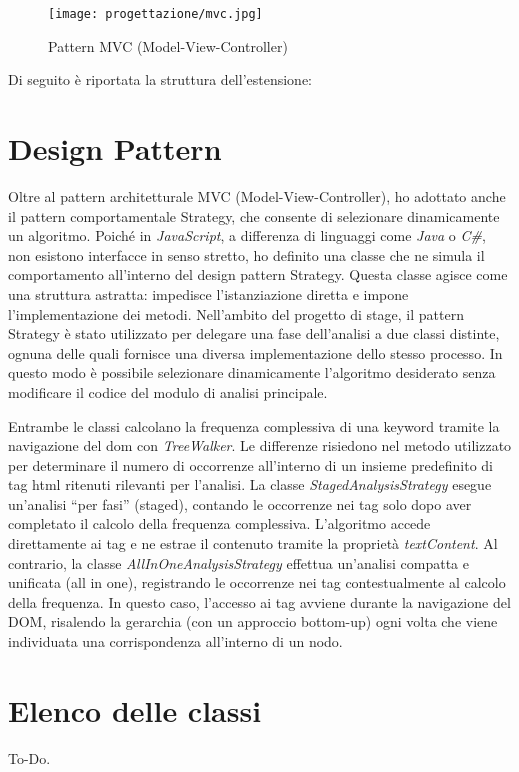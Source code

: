 \begin{figure}[H] 
    \centering 
    \texttt{[image: progettazione/mvc.jpg]} 
    \caption{Pattern MVC (Model-View-Controller)}
\end{figure}

\par\noindent Di seguito è riportata la struttura dell'estensione:

\vspace{10pt}
\begin{samepage}
\end{samepage}

\section{Design Pattern}
\label{sec:design-pattern}

\par Oltre al pattern architetturale MVC (Model-View-Controller), ho adottato anche il pattern comportamentale Strategy, che consente di selezionare dinamicamente un algoritmo. Poiché in \textit{JavaScript}, a differenza di linguaggi come \textit{Java} o \textit{C\#}, non esistono interfacce in senso stretto, ho definito una classe che ne simula il comportamento all’interno del design  pattern Strategy. Questa classe agisce come una struttura astratta: impedisce l'istanziazione diretta e impone l’implementazione dei metodi. Nell’ambito del progetto di stage, il pattern Strategy è stato utilizzato per delegare una fase dell’analisi a due classi distinte, ognuna delle quali fornisce una diversa implementazione dello stesso processo. In questo modo è possibile selezionare dinamicamente l’algoritmo desiderato senza modificare il codice del modulo di analisi principale.

\vspace{10pt}
\par\noindent Entrambe le classi calcolano la frequenza complessiva di una keyword tramite la navigazione del \gls{dom} con \textit{TreeWalker}. Le differenze risiedono nel metodo utilizzato per determinare il numero di occorrenze all’interno di un insieme predefinito di tag \gls{html} ritenuti rilevanti per l’analisi. La classe \textit{StagedAnalysisStrategy} esegue un’analisi “per fasi” (staged), contando le occorrenze nei tag solo dopo aver completato il calcolo della frequenza complessiva. L’algoritmo accede direttamente ai tag e ne estrae il contenuto tramite la proprietà \textit{textContent}. Al contrario, la classe \textit{AllInOneAnalysisStrategy} effettua un’analisi compatta e unificata (all in one), registrando le occorrenze nei tag contestualmente al calcolo della frequenza. In questo caso, l’accesso ai tag avviene durante la navigazione del DOM, risalendo la gerarchia (con un approccio bottom-up) ogni volta che viene individuata una corrispondenza all’interno di un nodo.

\section{Elenco delle classi}
\label{sec:elenco-classi}

\par To-Do.
